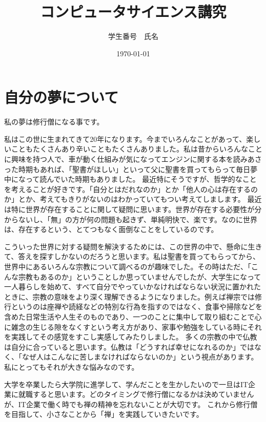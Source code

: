 \documentclass[a4paper]{jarticle}
\title{コンピュータサイエンス講究}
\author{学生番号　氏名}
\date{\today}
\begin{document}
\maketitle
\section{自分の夢について}
\begin{comment}
私の夢は修行僧になる事です。
２０年間生きてき
いろんなことをやりました。水泳、ボーイスカウト、まなたび、
辛いこともたくさんあった。
世界に対していろんな疑問を持つ。ほかの命を奪わなければ生きていけないという自然の摂理、世界が存在する必要性を感じない、「無」のほうが何の問題も起きないし、簡単だし、楽。
こういう疑問を解決するためには、「生きる」という道しかない。だから生きる。
「苦」というものに向き合い、生涯「苦」とたたかい続けてきた釈尊の生き方にあこがれる。
多くの人は、どうしたら幸せになれるかということばかり考えているが、仏教ではなぜ人はこんなに苦しまなければいけないのかという視点がある。
自分だけ幸せになって、この世の苦しみから目をそらすような人にはなりたくない。
仏教の中でも、「禅」に興味がある。禅はとても実践的なもので、座禅や読経などの特別な行為のみを修行ととらえるのではなく、食事や掃除などを含めた生活や人生そのものが修行であるとする考え方
一つのことに集中することで心に雑念の生じるすきをなくす。
修行僧を目指して、小さなことから「禅」を実践していきたい。
父に聖書を買ってもらった。キリスト教徒ではないが。それ以来いろんな宗教について調べるのが趣味になった。
\end{comment}
私の夢は修行僧になる事です。

私はこの世に生まれてきて20年になります。今までいろんなことがあって、楽しいこともたくさんあり辛いこともたくさんありました。私は昔からいろんなことに興味を持つ人で、車が動く仕組みが気になってエンジンに関する本を読みあさった時期もあれば、「聖書がほしい」といって父に聖書を買ってもらって毎日夢中になって読んでいた時期もありました。
最近特にそうですが、哲学的なことを考えることが好きです。「自分とはだれなのか」とか「他人の心は存在するのか」とか、考えてもきりがないのはわかっていてもつい考えてしまします。
最近は特に世界が存在することに関して疑問に思います。世界が存在する必要性が分からないし、「無」の方が何の問題も起きず、単純明快で、楽です。なのに世界は、存在するという、とてつもなく面倒なことをしているのです。

こういった世界に対する疑問を解決するためには、この世界の中で、懸命に生きて、答えを探すしかないのだろうと思います。私は聖書を買ってもらってから、世界中にあるいろんな宗教について調べるのが趣味でした。その時はただ、「こんな宗教もあるのか」ということしか思っていませんでしたが、大学生になって一人暮らしを始めて、すべて自分でやっていかなければならない状況に置かれたときに、宗教の意味をより深く理解できるようになりました。例えば禅宗では修行というのは座禅や読経などの特別な行為を指すのではなく、食事や掃除などを含めた日常生活や人生そのものであり、一つのことに集中して取り組むことで心に雑念の生じる隙をなくすという考え方があり、家事や勉強をしている時にそれを実践してその感覚をすこし実感してみたりしました。
多くの宗教の中で仏教は自分に合っていると思います。仏教は「どうすれば幸せになれるのか」ではなく、「なぜ人はこんなに苦しまなければならないのか」という視点があります。私にとってもそれが大きな悩みなのです。

大学を卒業したら大学院に進学して、学んだことを生かしたいので一旦はIT企業に就職すると思います。どのタイミングで修行僧になるかは決めていませんが、IT企業で働く時でも禅の精神を忘れないことが大切です。
これから修行僧を目指して、小さなことから「禅」を実践していきたいです。
\end{document}

